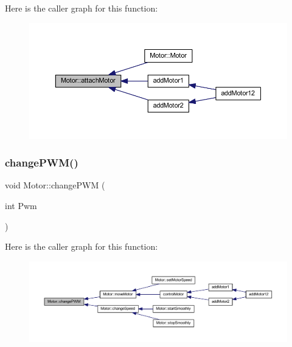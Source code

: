 Here is the caller graph for this function\+:\nopagebreak
\begin{figure}[H]
\begin{center}
\leavevmode
\includegraphics[width=350pt]{class_motor_a6726cda4183f9b9f4fd3d8af52d9e87d_icgraph}
\end{center}
\end{figure}
\mbox{\label{class_motor_aea0ccda5c88406ca40b2d2283eab9114}} 
\subsubsection{\texorpdfstring{change\+P\+W\+M()}{changePWM()}}
{\footnotesize\ttfamily void Motor\+::change\+P\+WM (\begin{DoxyParamCaption}\item[{int}]{Pwm }\end{DoxyParamCaption})}

Here is the caller graph for this function\+:\nopagebreak
\begin{figure}[H]
\begin{center}
\leavevmode
\includegraphics[width=350pt]{class_motor_aea0ccda5c88406ca40b2d2283eab9114_icgraph}
\end{center}
\end{figure}
\mbox{\label{class_motor_a6b966366a7a184ae6b3c3227f5d57213}} 

